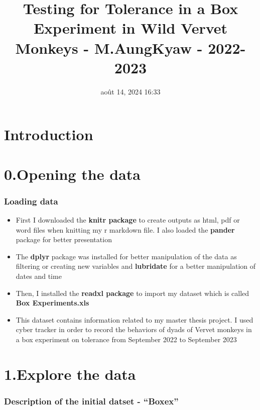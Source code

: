 \documentclass[
]{article}
\title{Testing for Tolerance in a Box Experiment in Wild Vervet Monkeys
- M.AungKyaw - 2022-2023}
\author{}
\date{\vspace{-2.5em}août 14, 2024 16:33}
\providecommand{\tightlist}{%
  \setlength{\itemsep}{0pt}\setlength{\parskip}{0pt}}
\begin{document}
\maketitle

{
\setcounter{tocdepth}{6}
\tableofcontents
}
\hypertarget{introduction}{%
\section{Introduction}\label{introduction}}

\hypertarget{opening-the-data}{%
\section{0.Opening the data}\label{opening-the-data}}

\hypertarget{loading-data}{%
\subsubsection{Loading data}\label{loading-data}}

\begin{itemize}
\tightlist
\item
  First I downloaded the \textbf{knitr package} to create outputs as
  html, pdf or word files when knitting my r markdown file. I also
  loaded the \textbf{pander} package for better presentation
\item
  The \textbf{dplyr} package was installed for better manipulation of
  the data as filtering or creating new variables and \textbf{lubridate}
  for a better manipulation of dates and time
\item
  Then, I installed the \textbf{readxl package} to import my dataset
  which is called \textbf{Box Experiments.xls}
\item
  This dataset contains information related to my master thesis project.
  I used cyber tracker in order to record the behaviors of dyads of
  Vervet monkeys in a box experiment on tolerance from September 2022 to
  September 2023
\end{itemize}

\hypertarget{explore-the-data}{%
\section{1.Explore the data}\label{explore-the-data}}

\hypertarget{description-of-the-initial-datset---boxex}{%
\subsubsection{Description of the initial datset -
``Boxex''}\label{description-of-the-initial-datset---boxex}}
\end{document}
